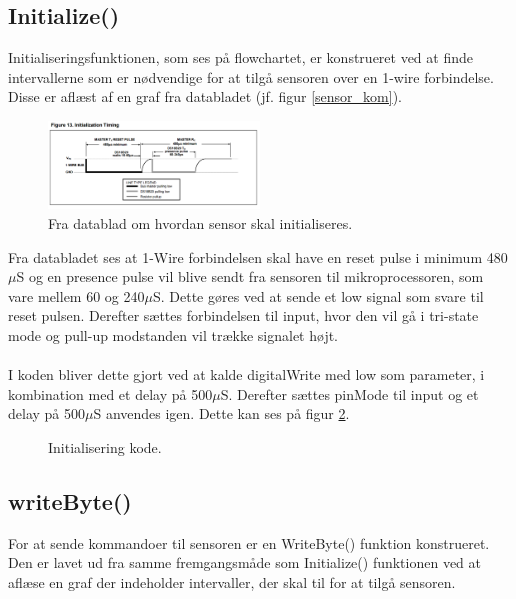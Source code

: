 \newpage
\subsection{Initialize()}
Initialiseringsfunktionen, som ses på flowchartet, er konstrueret ved at finde intervallerne som er nødvendige for at tilgå sensoren over en 1-wire forbindelse. Disse er aflæst af en graf fra databladet (jf. figur \ref{sensor_kom}).




\begin{figure}[h!]
  \centering
  \includegraphics[width=0.5\textwidth]{figures/Initialization_timing.png}
  \caption{Fra datablad om hvordan sensor skal initialiseres.}
  \label{sensor_init}
\end{figure}

Fra databladet ses at 1-Wire forbindelsen skal have en reset pulse i minimum 480$\mu$S og en presence pulse vil blive sendt fra sensoren til mikroprocessoren, som vare mellem 60 og 240$\mu$S. Dette gøres ved at sende et low signal som svare til reset pulsen. Derefter sættes forbindelsen til input, hvor den vil gå i tri-state mode og pull-up modstanden vil trække signalet højt. 
\\
\\
I koden bliver dette gjort ved at kalde digitalWrite med low som parameter, i kombination med et delay på 500$\mu$S. Derefter sættes pinMode til input og et delay på 500$\mu$S anvendes igen. Dette kan ses på figur \ref{sensor_kode}.

\begin{figure}[h!]
  \centering
  \caption{Initialisering kode.}
  \label{sensor_kode}
\end{figure}

\subsection{writeByte()}
For at sende kommandoer til sensoren er en WriteByte() funktion konstrueret. Den er lavet ud fra samme fremgangsmåde som Initialize() funktionen ved at aflæse en graf der indeholder intervaller, der skal til for at tilgå sensoren.

